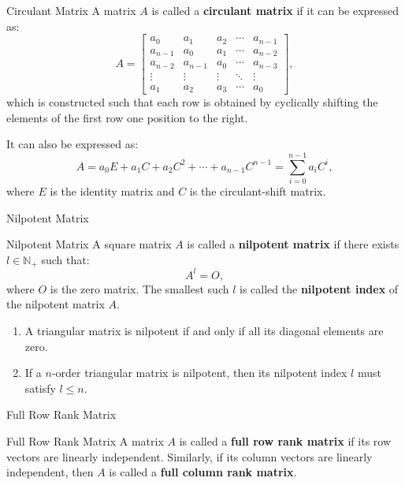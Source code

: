 \documentclass[11pt]{../../TexTemplate/elegantbook} %
\begin{document}
\begin{definition}{Circulant Matrix}
    A matrix \(A\) is called a \textbf{circulant matrix} if it can be expressed as:
    \[
    A = 
    \begin{bmatrix} 
        a_0 & a_1 & a_2 & \cdots & a_{n-1} \\ 
        a_{n-1} & a_0 & a_1 & \cdots & a_{n-2} \\ 
        a_{n-2} & a_{n-1} & a_0 & \cdots & a_{n-3} \\ 
        \vdots & \vdots & \vdots & \ddots & \vdots \\ 
        a_1 & a_2 & a_3 & \cdots & a_0
    \end{bmatrix},
    \]
    which is constructed such that each row is obtained by cyclically shifting 
    the elements of the first row one position to the right.

    It can also be expressed as:
    \[
    A = a_0 E + a_1 C + a_2 C^2 + \cdots + a_{n-1} C^{n-1} = \sum_{i=0}^{n-1} a_i C^i,
    \]
    where \(E\) is the identity matrix and \(C\) is the circulant-shift matrix.
\end{definition}


\begin{leftbarTitle}{Nilpotent Matrix}\end{leftbarTitle}
\begin{definition}{Nilpotent Matrix}
    A square matrix \(A\) is called a \textbf{nilpotent matrix} if there exists \(l\in \mathbb{N}_{+}\) such that:
    \[
    A^l = O,
    \]
    where \(O\) is the zero matrix.
    The smallest such \(l\) is called the \textbf{nilpotent index} of the nilpotent matrix \(A\).
\end{definition}

\begin{proposition}
    \begin{enumerate}
        \item A triangular matrix is nilpotent if and only if all its diagonal elements are zero. 
        \item If a \(n\)-order triangular matrix is nilpotent, then its nilpotent index \(l\) must satisfy \(l \leq n\).
    \end{enumerate}
\end{proposition}


\begin{leftbarTitle}{Full Row Rank Matrix}\end{leftbarTitle}
\begin{definition}{Full Row Rank Matrix}
    A matrix \(A\) is called a \textbf{full row rank matrix} if its row vectors are linearly independent.
    Similarly, if its column vectors are linearly independent, 
    then \(A\) is called a \textbf{full column rank matrix}.
\end{definition}
\end{document}
